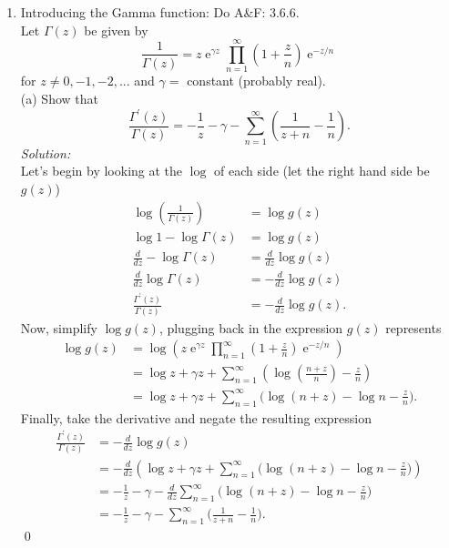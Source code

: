\documentclass[10pt]{amsart}
\DeclareMathOperator{\E}{e}
\theoremstyle{nonumberplain}
\begin{document}
\begin{enumerate}[label={\bf {\arabic*}:}]
\item Introducing the Gamma function: Do A\&F: 3.6.6. \\

\noindent
Let $\Gamma(z)$ be given by
$$
\frac 1 {\Gamma(z)} = z \E^{\gamma z} \prod_{n=1}^\infty \left( 1 + \frac z n \right) \E^{-z / n}
$$
for $z \neq 0, -1, -2, ...$ and $\gamma = $ constant (probably real). \\

\noindent
(a) Show that 
$$
\frac {\Gamma^\prime(z)}{\Gamma(z)} = - \frac 1 z - \gamma - \sum_{n = 1}^\infty \left( \frac 1 {z + n} - \frac 1 n\right).
$$
\textit{Solution:} \\
Let's begin by looking at the $\log$ of each side (let the right hand side be $g(z)$)
\begin{align*}
\log \left( \frac 1 {\Gamma(z)} \right) &= \log g(z) \\
\log 1 - \log \Gamma(z)  &= \log g(z) \\
\frac d {d z} - \log\Gamma(z) &= \frac d {dz} \log g(z) \\
\frac d {d z} \log \Gamma(z) &=  - \frac d {dz} \log g(z) \\
\frac {\Gamma^\prime(z)}{\Gamma(z)} &=  - \frac d {dz} \log g(z).
\end{align*}
Now, simplify $\log g(z)$, plugging back in the expression $g(z)$ represents
\begin{align*}
\log g(z) &= \log \left( z \E^{\gamma z} \prod_{n=1}^\infty \left( 1 + \frac z n \right) \E^{-z / n} \right) \\
	&= \log z + \gamma z + \sum_{n=1}^\infty \left( \log \left(  \frac {n + z} n \right)  - \frac z  n \right) \\
	&= \log z + \gamma z + \sum_{n=1}^\infty \bigg( \log (n + z) - \log n  - \frac z  n \bigg).
\end{align*}
Finally, take the derivative and negate the resulting expression
\begin{align*}
\frac {\Gamma^\prime(z)}{\Gamma(z)} &= - \frac d {dz} \log g(z) \\
	&= - \frac d {dz}\left( \log z + \gamma z + \sum_{n=1}^\infty \bigg( \log (n + z) - \log n  - \frac z  n \bigg) \right) \\
	&= - \frac 1 z - \gamma - \frac d {dz}\sum_{n=1}^\infty \bigg( \log (n + z) - \log n  - \frac z  n \bigg) \\
	&= - \frac 1 z - \gamma - \sum_{n=1}^\infty \bigg( \frac 1 {z + n} - \frac 1 n \bigg).
\end{align*}
\qed \\


\end{enumerate}
\end{document}
